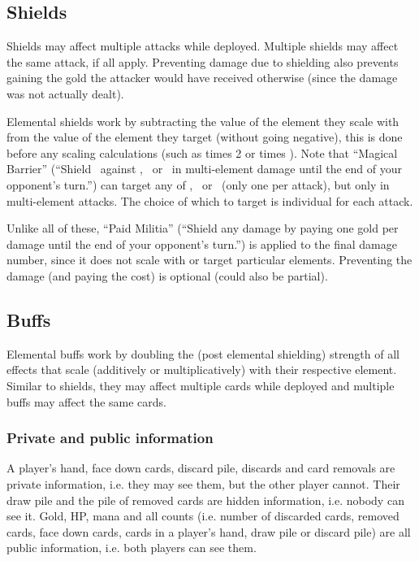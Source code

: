\documentclass[dvipsnames,parskip,a4paper]{scrartcl}
\newcommand{\iconsize}{3.4mm}
\newcommand{\icondepth}{0.45mm}
\newcommand{\icon}[1]{\raisebox{-\icondepth}{\texttt{[image:  \#1 ]}}}
\newcommand{\fire}{\icon{icons/fire.png}}
\newcommand{\earth}{\icon{icons/earth.png}}
\newcommand{\water}{\icon{icons/water.png}}
\newcommand{\magic}{\icon{icons/magic.png}}
\begin{document}
\subsection*{Shields}

Shields may affect multiple attacks while deployed. Multiple shields may affect the same attack, if all apply. Preventing damage due to shielding also prevents gaining the gold the attacker would have received otherwise (since the damage was not actually dealt).

Elemental shields work by subtracting the value of the element they scale with from the value of the element they target (without going negative), this is done before any scaling calculations (such as times 2 or times \magic). Note that ``Magical Barrier'' (``Shield \magic \ against \fire, \earth \ or \water \ in multi-element damage until the end of your opponent's turn.'') can target any of \fire, \earth \ or \water \ (only one per attack), but only in multi-element attacks. The choice of which to target is individual for each attack.

Unlike all of these, ``Paid Militia'' (``Shield any damage by paying one gold per damage until the end of your opponent's turn.'') is applied to the final damage number, since it does not scale with or target particular elements. Preventing the damage (and paying the cost) is optional (could also be partial).

\subsection*{Buffs}

Elemental buffs work by doubling the (post elemental shielding) strength of all effects that scale (additively or multiplicatively) with their respective element. Similar to shields, they may affect multiple cards while deployed and multiple buffs may affect the same cards.

\subsubsection*{Private and public information}

A player's hand, face down cards, discard pile, discards and card removals are private information, i.e. they may see them, but the other player cannot. Their draw pile and the pile of removed cards are hidden information, i.e. nobody can see it. Gold, HP, mana and all counts (i.e. number of discarded cards, removed cards, face down cards, cards in a player's hand, draw pile or discard pile) are all public information, i.e. both players can see them.
\end{document}
